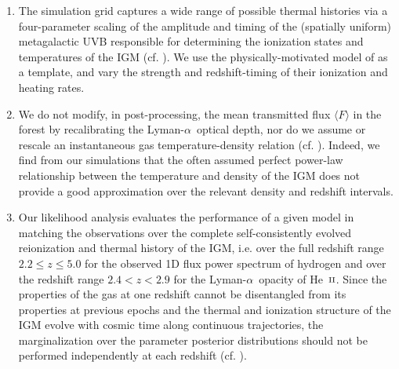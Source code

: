 \documentclass[twocolumn]{aastex62}
\newcommand\Lya{Lyman-$\alpha$}
\def\HeII{\hbox{He~$\scriptstyle\rm II$}}
\begin{document}
\begin{enumerate}

\item The simulation grid captures a wide range of possible thermal histories via a four-parameter 
scaling of the amplitude and timing
of the (spatially uniform) 
metagalactic UVB
responsible for determining the ionization states and temperatures of the IGM
(cf. \citealt{Nasir+2016,onorbe2017a}).
We use the physically-motivated model of \citet{puchwein2019a} as a template, and vary
the strength and redshift-timing of their ionization and heating rates.


\item We do not modify, in post-processing, the mean transmitted flux $\langle F\rangle$ in the forest by recalibrating the \Lya\ optical 
depth, nor do we assume or rescale an instantaneous gas temperature-density relation (cf. \citealt{viel2013a,Irsic+2017b,boera2019a,walther2021}).
Indeed, we find from our simulations that the often assumed perfect power-law relationship between the temperature and density of the IGM does not provide
a good approximation over the relevant density and redshift intervals.

\item Our likelihood analysis evaluates
the performance of a given model in matching the observations over the
complete self-consistently evolved reionization and thermal history of the IGM, i.e. over the full redshift
range  $2.2\leq z\leq 5.0$
for the observed 1D flux power spectrum  of hydrogen and over the 
redshift range $2.4<z<2.9$ for the \Lya\ opacity of \HeII. Since the 
properties of the gas at one redshift cannot be disentangled from its properties at previous epochs and the
thermal and ionization structure of the IGM evolve with cosmic time along continuous trajectories, 
the marginalization over the parameter posterior distributions 
should not be
performed independently at each redshift (cf. \citealt{bolton2014a, Nasir+2016, hiss2018a,  boera2019a,   walther2019a, gaikwad2020b}).



\end{enumerate}
\end{document}
